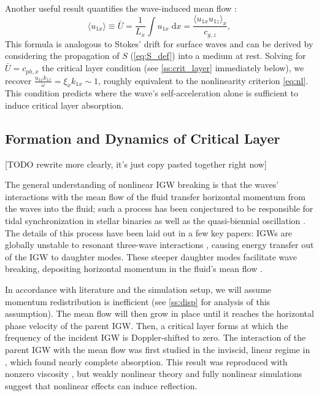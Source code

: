 \documentclass[
        fleqn,
        usenatbib,
    ]{mnras}
\newcommand*{\ev}[1]{\langle#1\rangle}
\begin{document}
Another useful result quantifies the wave-induced mean flow
\citep{eliassen_palm_cite,sutherland0}:
\begin{equation}
     \ev{u_{1x}} \equiv \bar{U} = \frac{1}{L_x}
        \int\limits u_{1x}\;\mathrm{d}x = \frac{\ev{u_{1x}u_{1z}}_x}{c_{g,z}},
        \label{eq:mean_flow}
\end{equation}
This formula is analogous to Stokes' drift for surface waves and can be derived
by considering the propagation of $S$ (\autoref{eq:S_def}) into a medium at
rest. Solving for $\bar{U} = c_{ph, x}$ the critical layer condition (see
\autoref{ss:crit_layer} immediately below), we recover
$\frac{u_{1x}k_{1x}}{\omega} = \xi_x k_{1x} \sim 1$, roughly equivalent to the
nonlinearity criterion \autoref{eq:nl}. This condition predicts where the wave's
self-acceleration alone is sufficient to induce critical layer absorption.

\subsection{Formation and Dynamics of Critical Layer}\label{ss:crit_layer}

[TODO rewrite more clearly, it's just copy pasted together right now]

The general understanding of nonlinear IGW breaking is that the waves'
interactions with the mean flow of the fluid transfer horizontal momentum from
the waves into the fluid; such a process has been conjectured to be responsible
for tidal synchronization in stellar binaries \citep{zahn75,gn89} as well as the
quasi-biennial oscillation \citep{lindzen_qbo}. The details of this process have
been laid out in a few key papers: IGWs are globally unstable to resonant
three-wave interactions \citep{drazin}, causing energy transfer out of the IGW
to daughter modes. These steeper daughter modes facilitate wave breaking,
depositing horizontal momentum in the fluid's mean flow \citep{klostermeyer}.

In accordance with literature and the simulation setup, we will assume momentum
redistribution is inefficient (see \autoref{ss:disp} for analysis of this
assumption). The mean flow will then grow in place until it reaches the
horizontal phase velocity of the parent IGW\@. Then, a critical layer forms at
which the frequency of the incident IGW is Doppler-shifted to zero. The
interaction of the parent IGW with the mean flow was first studied in the
inviscid, linear regime in \citep{booker_bretherton}, which found nearly
complete absorption. This result was reproduced with nonzero viscosity
\citep{hazel}, but weakly nonlinear theory \citep{brown_stewartson} and fully
nonlinear simulations \citep{winters1994} suggest that nonlinear effects can
induce reflection.
\end{document}
